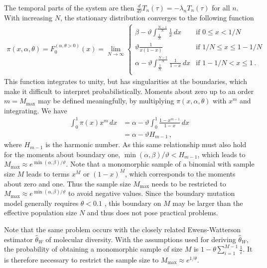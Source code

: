 \documentclass[preprint]{elsarticle}
\begin{document}
The temporal parts of the system are then $\frac{d}{d\tau} T_n(\tau)= -\lambda_n T_n(\tau)$ for all $n$. With increasing $N$, the stationary distribution converges to the following function \citep{Vogl15,Vogl16}
\begin{align}\label{eq:forw_bounddrift-stat}
  \pi(x, \alpha, \theta) = F_0^{(\alpha,\theta>0)}(x)=\lim_{N\to\infty}
  \begin{cases}
    \beta-\vartheta \int_{\tfrac1N}^{\tfrac{N-1}N} \frac1x\,dx     & \text{if } 0 \leq x < 1/N         \\
    \vartheta\frac{1}{x(1-x)}                                                 & \text{if } 1/N \le x \le 1-1/N \\
    \alpha-\vartheta \int_{\tfrac1N}^{\tfrac{N-1}N} \frac1{1-x}\,dx  & \text{if } 1-1/N < x \leq 1 \,.      \\
\end{cases}
\end{align}
This function integrates to unity, but has singularities at the boundaries, which make it difficult to interpret probabilistically. Moments about zero up to an order $m=M_{\max}$ may be defined meaningfully, by multiplying $\pi(x,\alpha,\theta)$ with $x^m$ and integrating. We have
\begin{equation}
\begin{split}
    \int_0^1 \pi(x) x^m \, dx&= \alpha -\vartheta\int_0^1 \frac{1-x^{m-1}}{1-x}\,dx\\
    &=\alpha-\vartheta H_{m-1}\,,
\end{split}
\end{equation}
where $H_{m-1}$ is the harmonic number. As this same relationship must also hold for the moments about boundary one, $\min(\alpha,\beta)/\vartheta< H_{m-1}$, which leads to $M_{\max}\approx e^{\min(\alpha,\beta)/\vartheta}$. Note that a monomorphic sample of a binomial with sample size $M$ leads to terms $x^M$ or $(1-x)^M$, which corresponds to the moments about zero and one. Thus the sample size $M_{\max}$ needs to be restricted to $M_{\max}\approx e^{\min(\alpha,\beta)/\vartheta}$ to avoid negative values. Since the boundary mutation model generally requires $\theta<0.1$ \citep{Vogl15}, this boundary on $M$ may be larger than the effective population size $N$ and thus does not pose practical problems. 

Note that the same problem occurs with the closely related Ewens-Watterson estimator $\hat \theta_W$ of molecular diversity. With the assumptions used for deriving $\hat \theta_W$, the probability of obtaining a monomorphic sample of size $M$ is $1-\theta\sum_{i=1}^{M-1} \frac{1}{i}$. It is therefore necessary to restrict the sample size to $M_{\max}\approx e^{1/\theta}$. 
\end{document}
